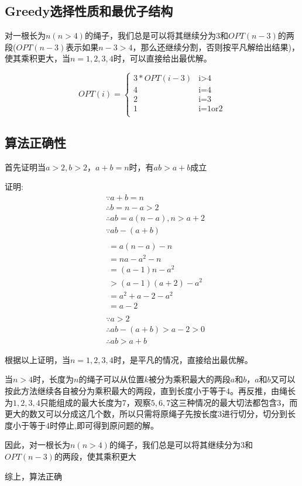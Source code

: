 \documentclass{article}
\begin{document}
\subsection{Greedy选择性质和最优子结构}
对一根长为$n(n>4)$的绳子，我们总是可以将其继续分为3和$OPT(n-3)$的两段($OPT(n-3)$表示如果$n-3>4$，那么还继续分割，否则按平凡解给出结果)，使其乘积更大，当$n=1,2,3,4$时，可以直接给出最优解。
\begin{center}
    $$OPT(i)=
\begin{cases}
3*OPT(i-3)& \text{i>4}\\
4& \text{i=4}\\
2& \text{i=3}\\
1& \text{i=1or2}\\
\end{cases}$$
\end{center}

\subsection{算法正确性}
首先证明当$a>2, b>2，a+b=n$时，有$ab>a+b$成立
\par 证明:
\begin{displaymath}
    \begin{aligned}
    &\because a+b=n\\
    &\therefore b=n-a>2\\
    &\therefore ab=a(n-a), n>a+2 \\
    &\because ab-(a+b) \\
\end{aligned}
\end{displaymath}
\begin{displaymath}
    \begin{aligned}  
    &=a(n-a)-n \\
    &=na-a^2-n \\
    &=(a-1)n-a^2 \\
    &>(a-1)(a+2)-a^2 \\
    &=a^2+a-2-a^2 \\
    &=a-2 \\
\end{aligned}
\end{displaymath}
\begin{displaymath}
    \begin{aligned}
    &\because a>2 \\
    &\therefore ab-(a+b)>a-2>0 \\
    &\therefore ab>a+b
    \end{aligned}
\end{displaymath}
\par 根据以上证明，当$n=1,2,3,4$时，是平凡的情况，直接给出最优解。
\par 当$n > 4$时，长度为$n$的绳子可以从位置$k$被分为乘积最大的两段$a$和$b$，$a$和$b$又可以按此方法继续各自被分为乘积最大的两段，直到长度小于等于4。再反推，由绳长为$1,2,3,4$只能组成的最大长度为7，观察$5,6,7$这三种情况的最大切法都包含3，而更大的数又可以分成这几个数，所以只需将原绳子先按长度3进行切分，切分到长度小于等于4时停止,即可得到原问题的解。
\par 因此，对一根长为$n(n>4)$的绳子，我们总是可以将其继续分为3和$OPT(n-3)$的两段，使其乘积更大
\par 综上，算法正确
\end{document}
